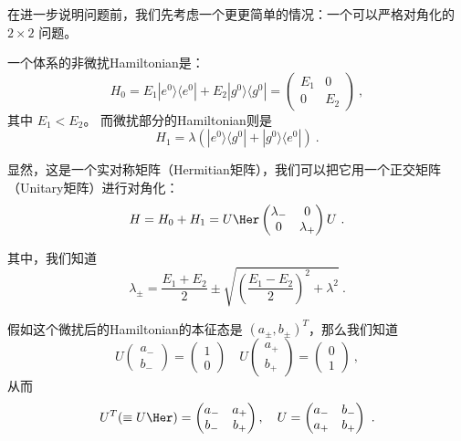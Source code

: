 在进一步说明问题前，我们先考虑一个更更简单的情况：一个可以严格对角化的 $2\times2$ 问题。

\begin{exercise}{}
一个体系的非微扰Hamiltonian是：
\begin{equation}
H_0 = E_1|e^0\rangle\langle e^0| + E_2|g^0\rangle\langle g^0| =  \left(\begin{matrix} E_1 & 0\\ 0 & E_2\end{matrix}\right)~,
\end{equation}
其中 $E_1<E_2$。 而微扰部分的Hamiltonian则是
\begin{equation}
H_1 = \lambda(|e^0\rangle\langle g^0|+|g^0\rangle\langle e^0|)~.
\end{equation}

显然，这是一个实对称矩阵（Hermitian矩阵），我们可以把它用一个正交矩阵（Unitary矩阵）进行对角化：
\begin{equation}
H = H_0+H_1 = U\Her\left(\begin{matrix} \lambda_- & 0\\0 & \lambda_+\end{matrix}\right)U~.
\end{equation}

其中，我们知道
\begin{equation}
\lambda_{\pm} = \frac{E_1+E_2}{2} \pm \sqrt{\left( \frac{E_1-E_2}{2}\right)^2 + \lambda^2}~.
\end{equation}

假如这个微扰后的Hamiltonian的本征态是 $(a_\pm,b_\pm)^T$，那么我们知道
\begin{equation}
U\left(\begin{matrix}a_-\\b_-\end{matrix}\right) = \left(\begin{matrix}1\\0\end{matrix}\right)\quad U\left(\begin{matrix}a_+\\b_+\end{matrix}\right) = \left(\begin{matrix}0\\1\end{matrix}\right)~,
\end{equation}
从而
\begin{equation}
U^T(\equiv U\Her) = \left(\begin{matrix}a_- & a_+\\b_- & b_+\end{matrix}\right), \quad U = \left(\begin{matrix}a_- & b_-\\a_+ & b_+\end{matrix}\right)~.
\end{equation}


\end{exercise}

